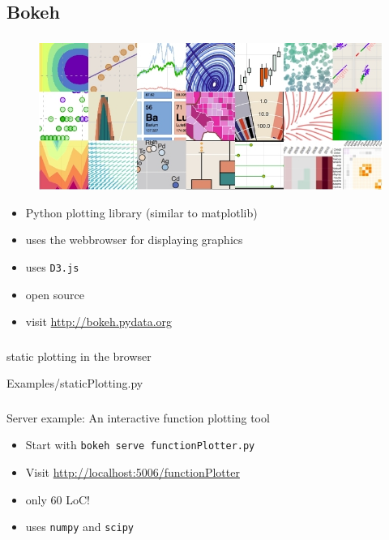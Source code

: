 \documentclass[11pt]{beamer}
\begin{document}
\subsection{Bokeh}
\begin{frame}
\frametitle{\insertsubsection}
\begin{figure}
\includegraphics[width=.8\textwidth]{Pictures/bokehGallery.jpg}
\end{figure}
\begin{itemize}
\item Python plotting library (similar to matplotlib)
\item uses the webbrowser for displaying graphics
\item uses \texttt{D3.js}
\item open source
\item visit \url{http://bokeh.pydata.org}
\end{itemize}
\end{frame}

\begin{frame}[fragile]
\frametitle{\insertsubsection}
\begin{block}{static plotting in the browser}

{Examples/staticPlotting.py}
\end{block}
\end{frame}

\begin{frame}
\frametitle{\insertsubsection}
\begin{block}{Server example: An interactive function plotting tool}
\begin{itemize}
\item Start with \texttt{bokeh serve functionPlotter.py}
\item Visit \url{http://localhost:5006/functionPlotter}
\pause
\item only 60 LoC!
\item uses \texttt{numpy} and \texttt{scipy}
\end{itemize}
\end{block}
\end{frame}
\end{document}
